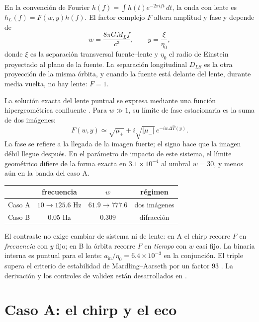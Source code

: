 \documentclass[11pt]{article}
\begin{document}
En la convención de Fourier $h(f)=\int h(t)e^{-2\pi ift}\,dt$, la onda con
lente es $h_L(f)=F(w,y)h(f)$. El factor complejo $F$ altera amplitud y fase
y depende de
\begin{equation}
  w=\frac{8\pi GM_Lf}{c^3},\qquad
  y=\frac{\xi}{\eta_0},
  \label{eq:wy}
\end{equation}
donde $\xi$ es la separación transversal fuente--lente y $\eta_0$ el
radio de Einstein proyectado al plano de la fuente. La separación
longitudinal $D_{LS}$ es la otra proyección de la misma órbita, y cuando
la fuente está delante del lente, durante media vuelta, no hay lente:
$F=1$.

La solución exacta del lente puntual se expresa mediante una función
hipergeométrica confluente \citep{Deguchi1986,Takahashi2003}. Para
$w\gg1$, su límite de fase estacionaria es la suma de dos imágenes:
\begin{equation}
  F(w,y)\simeq\sqrt{\mu_+}
  +i\sqrt{|\mu_-|}\,e^{-iw\Delta\hat T(y)} .
  \label{eq:geo}
\end{equation}
La fase se refiere a la llegada de la imagen fuerte; el signo hace que
la imagen débil llegue después. En el parámetro de impacto de este
sistema, el límite geométrico difiere de la forma exacta en
$3.1\times10^{-4}$ al umbral $w=30$, y menos aún en la banda del caso A.

\begin{center}
\begin{tabular}{lccc}
\toprule
 & frecuencia & $w$ & régimen \\
\midrule
Caso A & $10\to125.6$ Hz & $61.9\to777.6$ & dos imágenes \\
Caso B & $0.05$ Hz & $0.309$ & difracción \\
\bottomrule
\end{tabular}
\end{center}

El contraste no exige cambiar de sistema ni de lente: en A el chirp
recorre $F$ en \emph{frecuencia} con $y$ fijo; en B la órbita recorre $F$
en \emph{tiempo} con $w$ casi fijo. La binaria interna es puntual para el
lente: $a_\mathrm{in}/\eta_0=6.4\times10^{-3}$ en la conjunción. El
triple supera el criterio de estabilidad de Mardling--Aarseth por un
factor $93$ \citep{MardlingAarseth2001}. La derivación y los controles de
validez están desarrollados en \citep{Teoria}.

\section{Caso A: el chirp y el eco}
\end{document}
